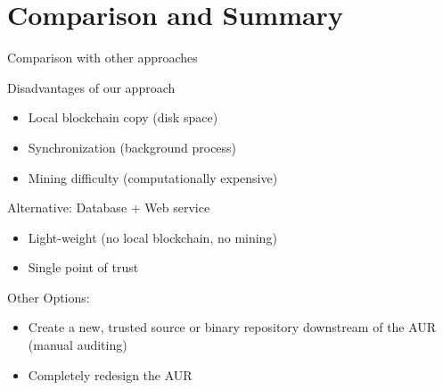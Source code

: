 \documentclass{beamer}
\begin{document}
\section{Comparison and Summary}
\begin{frame}{Comparison with other approaches}

	\begin{block}{Disadvantages of our approach}
		\begin{itemize}
			\item Local blockchain copy (disk space)
			\item Synchronization (background process)
			\item Mining difficulty (computationally expensive)
		\end{itemize}
	\end{block}

	\pause
	\begin{block}{Alternative: Database + Web service}
		\begin{itemize}
			\item Light-weight (no local blockchain, no mining)
			\item Single point of trust
		\end{itemize}
	\end{block}

	\pause
	\begin{block}{Other Options:}
		\begin{itemize}
			\item Create a new, trusted source or binary repository downstream of the AUR (manual auditing)
			\item Completely redesign the AUR
		\end{itemize}
	\end{block}
\end{frame}

\end{document}
